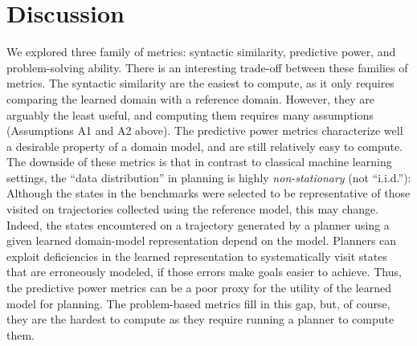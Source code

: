\documentclass{article}
\theoremstyle{definition}
\theoremstyle{remark}
\newif\ifaddcomments
\newcommand{\roni}[1]{\ifaddcomments{\textcolor{red}{[Roni: #1]}}\fi}
\begin{document}
\section{Discussion}
We explored three family of metrics: syntactic similarity, predictive power, and problem-solving ability. 
There is an interesting trade-off between these families of metrics. 
The syntactic similarity are the easiest to compute, as it only requires comparing the learned domain with a reference domain. However, they are arguably the least useful, and computing them requires many assumptions (Assumptions A1 and A2 above). 
The predictive power metrics characterize well a desirable property of a domain model, and are still relatively easy to compute. 
The downside of these metrics is that in contrast to classical machine learning settings, the ``data distribution'' in planning is highly \emph{non-stationary} (not ``i.i.d.''):  Although the states in the benchmarks were selected to be representative of those visited on trajectories collected using the reference model, this may change. Indeed, the states encountered on a trajectory generated by a planner using a given learned domain-model representation depend on the model. Planners can exploit deficiencies in the learned representation to systematically visit states that are erroneously modeled, if those errors make goals easier to achieve. Thus, the predictive power metrics can be a poor proxy for the utility of the learned model for planning. The problem-based metrics fill in this gap, but, of course, they are the hardest to compute as they require running a planner to compute them. 





\end{document}
